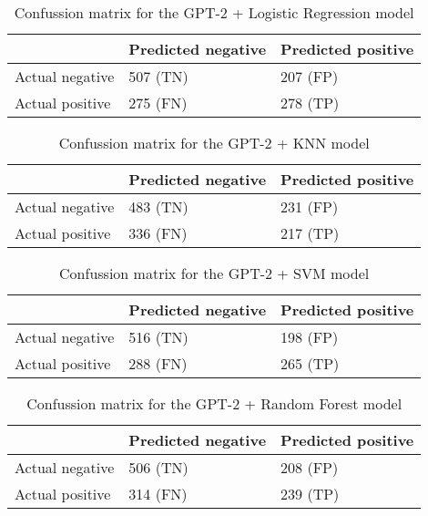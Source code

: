 
\begin{table}[H]
\centering
{
\makegapedcells
\begin{tabular}{lll}
                & Predicted negative & Predicted positive \\
\hline
Actual negative & 507 (TN)           & 207 (FP) \\
Actual positive & 275 (FN)           & 278 (TP) \\
\hline
\end{tabular}
}
\caption{Confussion matrix for the GPT-2 + Logistic Regression model}
\label{gpt2lr_cm}
\end{table}

\begin{table}[H]
\centering
{
\makegapedcells
\begin{tabular}{lll}
                & Predicted negative & Predicted positive \\
\hline
Actual negative & 483 (TN)           & 231 (FP) \\
Actual positive & 336 (FN)           & 217 (TP) \\
\hline
\end{tabular}
}
\caption{Confussion matrix for the GPT-2 + KNN model}
\label{gpt2knn_cm}
\end{table}

\begin{table}[H]
\centering
{
\makegapedcells
\begin{tabular}{lll}
                & Predicted negative & Predicted positive \\
\hline
Actual negative & 516 (TN)           & 198 (FP) \\
Actual positive & 288 (FN)           & 265 (TP) \\
\hline
\end{tabular}
}
\caption{Confussion matrix for the GPT-2 + SVM model}
\label{gpt2svm_cm}
\end{table}

\begin{table}[H]
\centering
{
\makegapedcells
\begin{tabular}{lll}
                & Predicted negative & Predicted positive \\
\hline
Actual negative & 506 (TN)           & 208 (FP) \\
Actual positive & 314 (FN)           & 239 (TP) \\
\hline
\end{tabular}
}
\caption{Confussion matrix for the GPT-2 + Random Forest model}
\label{gpt2rf_cm}
\end{table}

